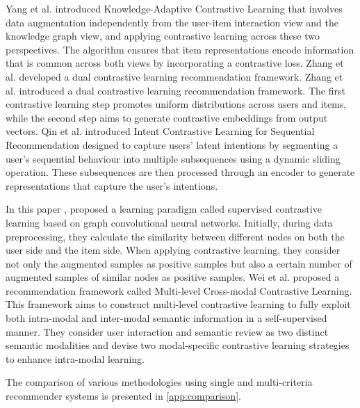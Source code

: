     Yang et al. \cite{yang2022knowledge} introduced Knowledge-Adaptive Contrastive Learning that involves  data augmentation independently from the user-item interaction view and the knowledge graph  view, and applying contrastive learning across these two perspectives. The algorithm ensures that item representations encode information that is common across both views by incorporating a contrastive loss. Zhang et al. \cite{zhang2024recdcl} developed a dual contrastive learning recommendation framework. Zhang et al. \cite{zhang2024recdcl} introduced a dual contrastive learning recommendation framework. The first contrastive learning step promotes uniform distributions across users and items, while the second step aims to generate contrastive embeddings from output vectors. Qin et al. \cite{qin2024intent} introduced Intent Contrastive Learning  for Sequential Recommendation designed to capture users' latent intentions by segmenting a user's sequential behaviour into multiple subsequences using a dynamic sliding operation. These subsequences are then processed through an encoder to generate representations that capture the user's intentions.
    
    In this paper \cite{yang2022supervised}, proposed a learning paradigm called supervised contrastive learning based on graph convolutional neural networks. Initially, during data preprocessing, they calculate the similarity between different nodes on both the user side and the item side. When applying contrastive learning, they consider not only the augmented samples as positive samples but also a certain number of augmented samples of similar nodes as positive samples. Wei et al. \cite{wei2024multi} proposed a recommendation framework called Multi-level Cross-modal Contrastive Learning. This framework aims to construct multi-level contrastive learning to fully exploit both intra-modal and inter-modal semantic information in a self-supervised manner. They consider user interaction and semantic review as two distinct semantic modalities and devise two modal-specific contrastive learning strategies to enhance intra-modal learning. 
    
    The comparison of various methodologies using single and multi-criteria recommender systems is presented in \ref{app:comparison}.